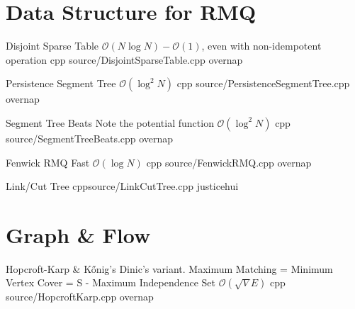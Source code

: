 \documentclass[landscape, 10pt, a4paper, oneside, twocolumn]{extarticle}
\begin{document}
\maketitlepage



\section{Data Structure for RMQ}



\Algorithm
{Disjoint Sparse Table}
{}
{$\mathcal{O}(N\log N)-\mathcal{O}(1)$, even with non-idempotent operation}
{cpp}
{source/DisjointSparseTable.cpp}
{overnap}



\Algorithm
{Persistence Segment Tree}
{}
{$\mathcal{O}(\log^2{N})$}
{cpp}
{source/PersistenceSegmentTree.cpp}
{overnap}

\Algorithm
{Segment Tree Beats}
{Note the potential function}
{$\mathcal{O}(\log^2{N})$}
{cpp}
{source/SegmentTreeBeats.cpp}
{overnap}

\Algorithm
{Fenwick RMQ}
{}
{Fast $\mathcal{O}(\log{N})$}
{cpp}
{source/FenwickRMQ.cpp}
{overnap}


\Algorithm
{Link/Cut Tree}
{}
{}
{cpp}{source/LinkCutTree.cpp}
{justicehui}


\section{Graph \& Flow}


\Algorithm
{Hopcroft-Karp \& Kőnig's}
{Dinic's variant. Maximum Matching = Minimum Vertex Cover = S - Maximum Independence Set}
{$\mathcal{O}(\sqrt{V}E)$}
{cpp}
{source/HopcroftKarp.cpp}
{overnap}
\end{document}
